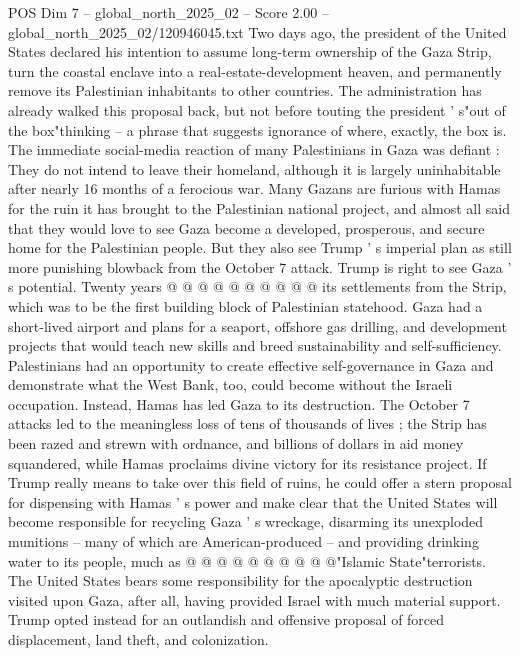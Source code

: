 \begin{textsample}{POS Dim 7 – global\_north\_2025\_02 – Score 2.00 – global\_north\_2025\_02/120946045.txt}  \label{ex:f7_pos_381}
Two days ago, the president of the United States declared his intention to assume long-term ownership of the Gaza Strip, turn the coastal enclave into a real-estate-development heaven, and permanently remove its Palestinian inhabitants to other countries.
The administration has already walked this proposal back, but not before touting the president ' s"out of the box"thinking -- a phrase that suggests ignorance of where, exactly, the box is.
The immediate social-media reaction of many Palestinians in Gaza was defiant : They do not intend to leave their homeland, although it is largely uninhabitable after nearly 16 months of a ferocious war.
Many Gazans are furious with Hamas for the ruin it has brought to the Palestinian national project, and almost all said that they would love to see Gaza become a developed, prosperous, and secure home for the Palestinian people.
But they also see Trump ' s imperial plan as still more punishing blowback from the October 7 attack.
Trump is right to see Gaza ' s potential.
Twenty years @ @ @ @ @ @ @ @ @ @ its settlements from the Strip, which was to be the first building block of Palestinian statehood.
Gaza had a short-lived airport and plans for a seaport, offshore gas drilling, and development projects that would teach new skills and breed sustainability and self-sufficiency.
Palestinians had an opportunity to create effective self-governance in Gaza and demonstrate what the West Bank, too, could become without the Israeli occupation.
Instead, Hamas has led Gaza to its destruction.
The October 7 attacks led to the meaningless loss of tens of thousands of lives ; the Strip has been razed and strewn with ordnance, and billions of dollars in aid money squandered, while Hamas proclaims divine victory for its resistance project.
If Trump really means to take over this field of ruins, he could offer a stern proposal for dispensing with Hamas ' s power and make clear that the United States will become responsible for recycling Gaza ' s wreckage, disarming its unexploded munitions -- many of which are American-produced -- and providing drinking water to its people, much as @ @ @ @ @ @ @ @ @ @"Islamic State"terrorists.
The United States bears some responsibility for the apocalyptic destruction visited upon Gaza, after all, having provided Israel with much material support.
Trump opted instead for an outlandish and offensive proposal of forced displacement, land theft, and colonization.

\end{textsample}
